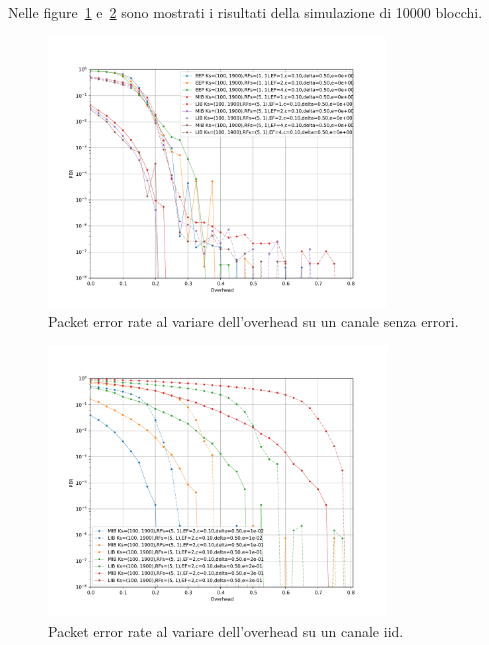 \documentclass[italian, a4paper, 12pt]{article}
\begin{document}
Nelle figure~\ref{fig:zero_oh} e~\ref{fig:iid_oh} sono mostrati i
risultati della simulazione di 10000 blocchi.
%
\begin{figure}[htb]
  \centering
  \includegraphics[width=0.8\textwidth]{plot_ber_zero_oh}
  \caption{Packet error rate al variare dell'overhead su un canale
    senza errori.}
  \label{fig:zero_oh}
\end{figure}
%
\begin{figure}[htb]
  \centering
  \includegraphics[width=0.8\textwidth]{plot_ber_iid}
  \caption{Packet error rate al variare dell'overhead su un canale
    iid.}
  \label{fig:iid_oh}
\end{figure}

%
%
\end{document}
